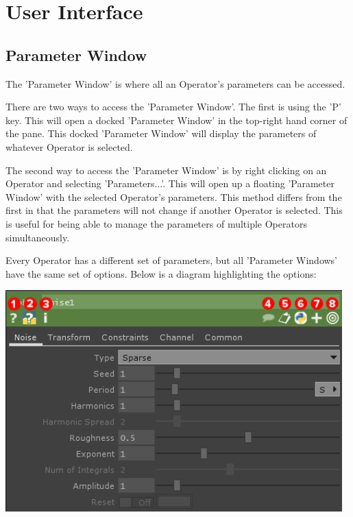 \cleardoublepage
\chapter{User Interface}
\label{ch:2}

\section{Parameter Window}

\begin{fullwidth}

The 'Parameter Window' is where all an Operator's parameters can be accessed.

There are two ways to access the 'Parameter Window'. The first is using the 'P' key. This will open a docked 'Parameter Window' in the top-right hand corner of the pane. This docked 'Parameter Window' will display the parameters of whatever Operator is selected.

The second way to access the 'Parameter Window' is by right clicking on an Operator and selecting 'Parameters...'. This will open up a floating 'Parameter Window' with the selected Operator's parameters. This method differs from the first in that the parameters will not change if another Operator is selected. This is useful for being able to manage the parameters of multiple Operators simultaneously.

Every Operator has a different set of parameters, but all 'Parameter Windows' have the same set of options. Below is a diagram highlighting the options:

\begin{center}
\includegraphics[width=13cm]{./img/2.1/parameter-window.png}
\end{center}


\end{fullwidth}
